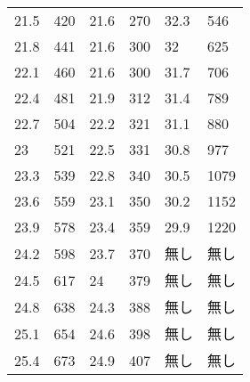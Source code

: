\documentclass{jsarticle}
\begin{document}
\begin{longtable}[h]
\begin{longtable}{llllll}
21.5                     & 420                     & 21.6                    & 270                     & 32.3                    & 546                     \\
21.8                     & 441                     & 21.6                    & 300                     & 32                      & 625                     \\
22.1                     & 460                     & 21.6                    & 300                     & 31.7                    & 706                     \\
22.4                     & 481                     & 21.9                    & 312                     & 31.4                    & 789                     \\
22.7                     & 504                     & 22.2                    & 321                     & 31.1                    & 880                     \\
23                       & 521                     & 22.5                    & 331                     & 30.8                    & 977                     \\
23.3                     & 539                     & 22.8                    & 340                     & 30.5                    & 1079                    \\
23.6                     & 559                     & 23.1                    & 350                     & 30.2                    & 1152                    \\
23.9                     & 578                     & 23.4                    & 359                     & 29.9                    & 1220                    \\
24.2                     & 598                     & 23.7                    & 370                     & 無し                      & 無し                      \\
24.5                     & 617                     & 24                      & 379                     & 無し                      & 無し                      \\
24.8                     & 638                     & 24.3                    & 388                     & 無し                      & 無し                      \\
25.1                     & 654                     & 24.6                    & 398                     & 無し                      & 無し                      \\
25.4                     & 673                     & 24.9                    & 407                     & 無し                      & 無し                      \\

\end{longtable}
\end{longtable}
\end{document}
